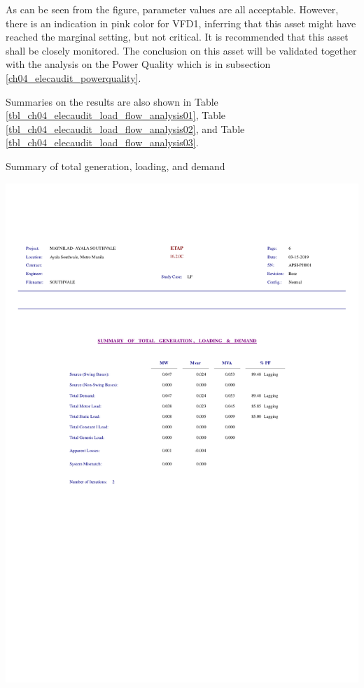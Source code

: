 As can be seen from the figure, parameter values are all acceptable. However, there is an indication in pink color for VFD1, inferring that this asset might have reached the marginal setting, but not critical. It is recommended that this asset shall be closely monitored. The conclusion on this asset will be validated together with the analysis on the Power Quality which is in subsection \ref{ch04_elecaudit_powerquality}.

Summaries on the results are also shown in Table \ref{tbl_ch04_elecaudit_load_flow_analysis01}, Table \ref{tbl_ch04_elecaudit_load_flow_analysis02}, and Table \ref{tbl_ch04_elecaudit_load_flow_analysis03}.



\begin{table}[]
	\caption{Summary of total generation, loading, and demand}
	\label{tbl_ch04_elecaudit_load_flow_analysis01}
	\includegraphics[width=\textwidth]{tables/tbl_ch04_elecaudit_load_flow_analysis01.pdf}		
\end{table}


